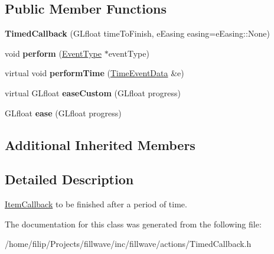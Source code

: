 \subsection*{Public Member Functions}
\begin{DoxyCompactItemize}
\item 
\hypertarget{classfillwave_1_1actions_1_1TimedCallback_aed5197bef9b665829d8a8793e73b00d0}{}{\bfseries Timed\+Callback} (G\+Lfloat time\+To\+Finish, e\+Easing easing=e\+Easing\+::\+None)\label{classfillwave_1_1actions_1_1TimedCallback_aed5197bef9b665829d8a8793e73b00d0}

\item 
\hypertarget{classfillwave_1_1actions_1_1TimedCallback_a05fce86d0daa0e05a12e2d0af5439fab}{}void {\bfseries perform} (\hyperlink{classfillwave_1_1actions_1_1EventType}{Event\+Type} $\ast$event\+Type)\label{classfillwave_1_1actions_1_1TimedCallback_a05fce86d0daa0e05a12e2d0af5439fab}

\item 
\hypertarget{classfillwave_1_1actions_1_1TimedCallback_a87293de2734156f76163d881a6bff70f}{}virtual void {\bfseries perform\+Time} (\hyperlink{structfillwave_1_1actions_1_1TimeEventData}{Time\+Event\+Data} \&e)\label{classfillwave_1_1actions_1_1TimedCallback_a87293de2734156f76163d881a6bff70f}

\item 
\hypertarget{classfillwave_1_1actions_1_1TimedCallback_ab897b2412b4eb0d1fd4d4c9122d68e04}{}virtual G\+Lfloat {\bfseries ease\+Custom} (G\+Lfloat progress)\label{classfillwave_1_1actions_1_1TimedCallback_ab897b2412b4eb0d1fd4d4c9122d68e04}

\item 
\hypertarget{classfillwave_1_1actions_1_1TimedCallback_a4bce910193fe287463005f8dcbd31e2b}{}G\+Lfloat {\bfseries ease} (G\+Lfloat progress)\label{classfillwave_1_1actions_1_1TimedCallback_a4bce910193fe287463005f8dcbd31e2b}

\end{DoxyCompactItemize}
\subsection*{Additional Inherited Members}


\subsection{Detailed Description}
\hyperlink{classfillwave_1_1actions_1_1ItemCallback}{Item\+Callback} to be finished after a period of time. 

The documentation for this class was generated from the following file\+:\begin{DoxyCompactItemize}
\item 
/home/filip/\+Projects/fillwave/inc/fillwave/actions/Timed\+Callback.\+h\end{DoxyCompactItemize}
